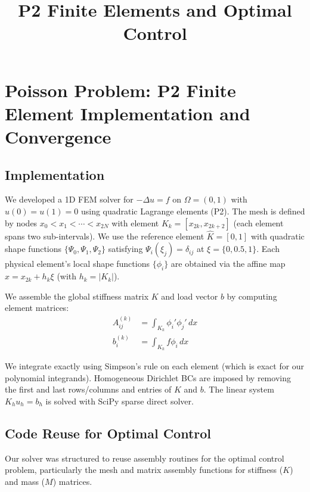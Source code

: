 \documentclass{article}
\title{P2 Finite Elements and Optimal Control}
\author{}
\date{}
\begin{document}
\maketitle

\section{Poisson Problem: P2 Finite Element Implementation and Convergence}

\subsection{Implementation}
We developed a 1D FEM solver for $-\Delta u = f$ on $\Omega = (0,1)$ with $u(0)=u(1)=0$ using quadratic Lagrange elements (P2). The mesh is defined by nodes $x_0 < x_1 < \cdots < x_{2N}$ with element $K_k = [x_{2k}, x_{2k+2}]$ (each element spans two sub-intervals). We use the reference element $\hat K=[0,1]$ with quadratic shape functions $\{\Psi_0,\Psi_1,\Psi_2\}$ satisfying $\Psi_i(\xi_j)=\delta_{ij}$ at $\xi=\{0,0.5,1\}$. Each physical element's local shape functions $\{\phi_i\}$ are obtained via the affine map $x = x_{2k} + h_k\xi$ (with $h_k = |K_k|$).

We assemble the global stiffness matrix $K$ and load vector $b$ by computing element matrices:
\begin{align*}
A^{(k)}_{ij} &= \int_{K_k}\phi_{i}'\phi_{j}'\,dx \\
b^{(k)}_{i} &= \int_{K_k}f\phi_i\,dx
\end{align*}

We integrate exactly using Simpson's rule on each element (which is exact for our polynomial integrands). Homogeneous Dirichlet BCs are imposed by removing the first and last rows/columns and entries of $K$ and $b$. The linear system $K_{h}u_h = b_{h}$ is solved with SciPy sparse direct solver.

\subsection{Code Reuse for Optimal Control}
Our solver was structured to reuse assembly routines for the optimal control problem, particularly the mesh and matrix assembly functions for stiffness ($K$) and mass ($M$) matrices.
\end{document}
